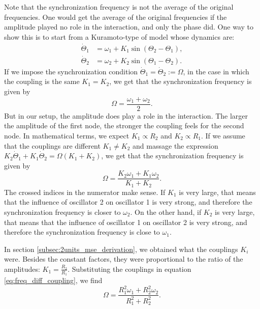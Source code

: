 \documentclass[11pt, a4paper]{article} %
\begin{document}
Note that the synchronization frequency is not the average of the original frequencies. One would get the average of the original 
frequencies if the amplitude played no role in the interaction, and only the phase did. One way to show this is to 
start from a Kuramoto-type of model whose dynamics are: 
\begin{align}
    \dot{\Theta}_1 &= \omega_1 + K_1 \sin(\Theta_2 - \Theta_1), \\
    \dot{\Theta}_2 &= \omega_2 + K_2 \sin(\Theta_1 - \Theta_2).
\end{align}
If we impose the synchronization condition $\dot{\Theta}_1 = \dot{\Theta}_2 := \Omega$, in the case in which the coupling is the same 
$K_1=K_2$, we get that the synchronization frequency is given by
\begin{equation}
    \Omega = \frac{\omega_1 + \omega_2}{2}.
\end{equation}
But in our setup, the amplitude does play a role in the interaction. The larger the amplitude of the first node, 
the stronger the coupling feels for the second node. In mathematical terms, we expect $K_1\propto R_2$ and $K_2 \propto R_1$. 
If we assume that the couplings are different $K_1\neq K_2$ and massage the expression 
$K_2 \dot{\Theta}_1 + K_1 \dot{\Theta}_2 = \Omega(K_1+K_2)$, we get that the synchronization frequency is given by
\begin{equation}
    \Omega = \frac{K_2 \omega_1 + K_1 \omega_2}{K_1 + K_2}.
    \label{eq:freq_diff_coupling}
\end{equation}
The crossed indices in the numerator make sense. If $K_1$ is very large, that means that the influence of oscillator 2 on oscillator 1 
is very strong, and therefore the synchronization frequency is closer to $\omega_2$. On the other hand, 
if $K_2$ is very large, that means that the influence of oscillator 1 on oscillator 2 is very strong, 
and therefore the synchronization frequency is close to $\omega_1$.

In section \ref{subsec:2units_mse_derivation}, we obtained what the couplings $K_i$ were. Besides the constant factors, 
they were proportional to the ratio of the amplitudes: $K_1 = \frac{R_2}{R_1}$. Substituting the couplings in 
equation \eqref{eq:freq_diff_coupling}, we find
\begin{equation}
    \Omega = \frac{R_1^2 \omega_1 + R_2^2 \omega_2}{R_1^2 + R_2^2}.
\end{equation}
\end{document}
